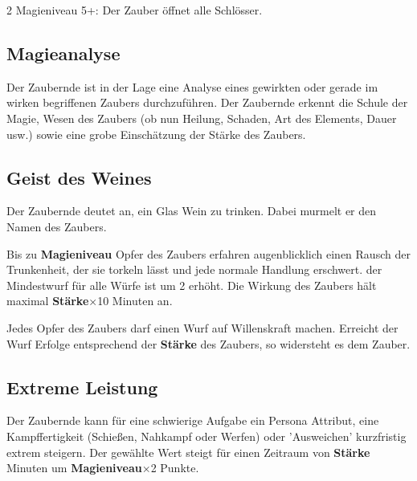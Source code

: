 \begin{multicols*}{2}
Magieniveau 5+: Der Zauber öffnet alle Schlösser.



\subsection{Magieanalyse}

Der Zaubernde ist in der Lage eine Analyse eines gewirkten oder gerade im wirken begriffenen Zaubers durchzuführen. Der Zaubernde erkennt die Schule der Magie, Wesen des Zaubers (ob nun Heilung, Schaden, Art des Elements, Dauer usw.) sowie eine grobe Einschätzung der Stärke des Zaubers.



\subsection{Geist des Weines}

Der Zaubernde deutet an, ein Glas Wein zu trinken. Dabei murmelt er den Namen des Zaubers.

Bis zu \textbf{Magieniveau} Opfer des Zaubers erfahren augenblicklich einen Rausch der Trunkenheit, der sie torkeln lässt und jede normale Handlung erschwert. der Mindestwurf für alle Würfe ist um 2 erhöht. Die Wirkung des Zaubers hält maximal \textbf{Stärke}×10 Minuten an.

Jedes Opfer des Zaubers darf einen Wurf auf Willenskraft machen. Erreicht der Wurf Erfolge entsprechend der \textbf{Stärke} des Zaubers, so widersteht es dem Zauber.



\subsection{Extreme Leistung}

Der Zaubernde kann für eine schwierige Aufgabe ein Persona Attribut, eine Kampffertigkeit (Schießen, Nahkampf oder Werfen) oder 'Ausweichen' kurzfristig extrem steigern. Der gewählte Wert steigt für einen Zeitraum von \textbf{Stärke} Minuten um \textbf{Magieniveau}×2 Punkte.




\end{multicols*}
